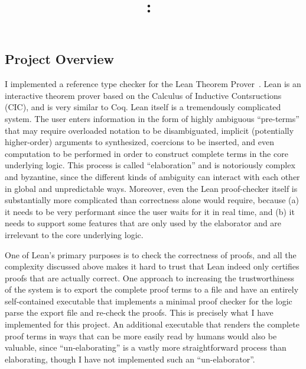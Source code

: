 \documentclass{article}
\title{\vspace{2in}\textmd{\textbf{\hmwkClass:\ \hmwkTitle}}\normalsize\vspace{0.1in}\vspace{0.1in}\vspace{3in}}
\date{}
\author{\textbf{\hmwkAuthorName}}
\begin{document}
\begin{spacing}{1.1}
\maketitle
\newpage


\clearpage
\section{Project Overview}

I implemented a reference type checker for the Lean Theorem Prover~\cite{de2015lean}. Lean is an interactive theorem prover based on the Calculus of Inductive Contsructions (CIC), and is very similar to Coq. Lean itself is a tremendously complicated system. The user enters information in the form of highly ambiguous ``pre-terms'' that may require overloaded notation to be disambiguated, implicit (potentially higher-order) arguments to synthesized, coercions to be inserted, and even computation to be performed in order to construct complete terms in the core underlying logic. This process is called ``elaboration'' and is notoriously complex and byzantine, since the different kinds of ambiguity can interact with each other in global and unpredictable ways. Moreover, even the Lean proof-checker itself is substantially more complicated than correctness alone would require, because (a) it needs to be very performant since the user waits for it in real time, and (b) it needs to support some features that are only used by the elaborator and are irrelevant to the core underlying logic.

One of Lean's primary purposes is to check the correctness of proofs, and all the complexity discussed above makes it hard to trust that Lean indeed only certifies proofs that are actually correct. One approach to increasing the trustworthiness of the system is to export the complete proof terms to a file and have an entirely self-contained executable that implements a minimal proof checker for the logic parse the export file and re-check the proofs. This is precisely what I have implemented for this project. An additional executable that renders the complete proof terms in ways that can be more easily read by humans would also be valuable, since ``un-elaborating'' is a vastly more straightforward process than elaborating, though I have not implemented such an ``un-elaborator''.


\end{spacing}
\end{document}
